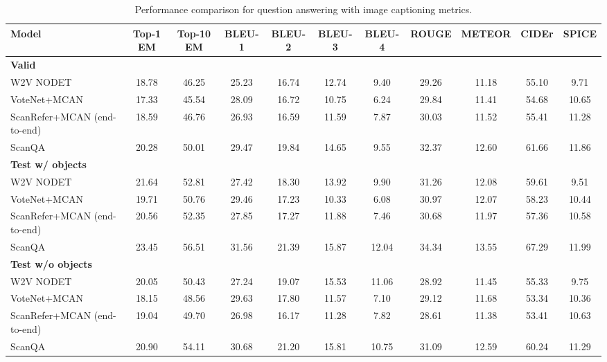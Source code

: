 \begin{table*}[t]
\begin{center}
	\footnotesize\begin{tabular}{lcccccccccc}
        \toprule
Model                & Top-1 EM & Top-10 EM & BLEU-1 & BLEU-2 & BLEU-3 & BLEU-4 & ROUGE & METEOR & CIDEr & SPICE \\
\midrule
\textbf{Valid} \\
W2V NODET 	 &  18.78 & 46.25 & 25.23 & 16.74 & 12.74 & 9.40 & 29.26 & 11.18 & 55.10 & 9.71 \\
VoteNet+MCAN 	 &  17.33 & 45.54 & 28.09 & 16.72 & 10.75 & 6.24 & 29.84 & 11.41 & 54.68 & 10.65 \\
ScanRefer+MCAN (end-to-end) 	 &  18.59 & 46.76 & 26.93 & 16.59 & 11.59 & 7.87 & 30.03 & 11.52 & 55.41 & 11.28 \\
ScanQA 	 &  20.28 & 50.01 & 29.47 & 19.84 & 14.65 & 9.55 & 32.37 & 12.60 & 61.66 & 11.86 \\
\midrule
\textbf{Test w/ objects} \\
W2V NODET 	 &  21.64 & 52.81 & 27.42 & 18.30 & 13.92 & 9.90 & 31.26 & 12.08 & 59.61 & 9.51 \\
VoteNet+MCAN 	 &  19.71 & 50.76 & 29.46 & 17.23 & 10.33 & 6.08 & 30.97 & 12.07 & 58.23 & 10.44 \\
ScanRefer+MCAN (end-to-end) 	 &  20.56 & 52.35 & 27.85 & 17.27 & 11.88 & 7.46 & 30.68 & 11.97 & 57.36 & 10.58 \\
ScanQA 	 &  23.45 & 56.51 & 31.56 & 21.39 & 15.87 & 12.04 & 34.34 & 13.55 & 67.29 & 11.99 \\
\midrule
\textbf{Test w/o objects} \\
W2V NODET 	 &  20.05 & 50.43 & 27.24 & 19.07 & 15.53 & 11.06 & 28.92 & 11.45 & 55.33 & 9.75 \\
VoteNet+MCAN 	 &  18.15 & 48.56 & 29.63 & 17.80 & 11.57 & 7.10 & 29.12 & 11.68 & 53.34 & 10.36 \\
ScanRefer+MCAN (end-to-end) 	 &  19.04 & 49.70 & 26.98 & 16.17 & 11.28 & 7.82 & 28.61 & 11.38 & 53.41 & 10.63 \\
ScanQA 	 &  20.90 & 54.11 & 30.68 & 21.20 & 15.81 & 10.75 & 31.09 & 12.59 & 60.24 & 11.29 \\
\bottomrule
	\end{tabular}
    \caption{
        Performance comparison for question answering with image captioning metrics.
    }
\label{table:performance2}
\end{center}
\end{table*}

